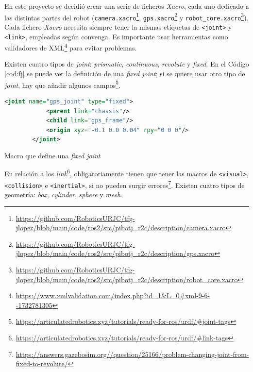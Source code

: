 En este proyecto se decidió crear una serie de ficheros \textit{Xacro}, cada uno dedicado a las distintas partes del robot (\verb|camera.xacro|\footnote{\url{https://github.com/RoboticsURJC/tfg-jlopez/blob/main/code/ros2/src/pibotj_r2c/description/camera.xacro}}, \verb|gps.xacro|\footnote{\url{https://github.com/RoboticsURJC/tfg-jlopez/blob/main/code/ros2/src/pibotj_r2c/description/gps.xacro}} y \verb|robot_core.xacro|\footnote{\url{https://github.com/RoboticsURJC/tfg-jlopez/blob/main/code/ros2/src/pibotj_r2c/description/robot_core.xacro}}). Cada fichero \textit{Xacro} necesita siempre tener la mismas etiquetas de \verb|<joint>| y \verb|<link>|, empleadas según convenga. Es importante usar herramientas como validadores de XML\footnote{\url{https://www.xmlvalidation.com/index.php?id=1&L=0\#xml-9-6--1732781305}} para evitar problemas.

Existen cuatro tipos de \textit{joint}: \textit{prismatic}, \textit{continuous}, \textit{revolute} y \textit{fixed}. En el Código \ref{cod:fj} se puede ver la definición de una \textit{fixed joint}; si se quiere usar otro tipo de \textit{joint}, hay que añadir algunos campos\footnote{\url{https://articulatedrobotics.xyz/tutorials/ready-for-ros/urdf/\#joint-tags}}.

\begin{code}[h]
	\begin{lstlisting}[language=xml]
		<joint name="gps_joint" type="fixed">
			<parent link="chassis"/>
			<child link="gps_frame"/>
			<origin xyz="-0.1 0.0 0.04" rpy="0 0 0"/>
		</joint>
	\end{lstlisting}
	\caption[Macro que define \textit{fixed joint}]{Macro que define una \textit{fixed joint}}
	\label{cod:fj}
			\end{code}

En relación a los \textit{link}\footnote{\url{https://articulatedrobotics.xyz/tutorials/ready-for-ros/urdf/\#link-tags}}, obligatoriamente tienen que tener las macros de \verb|<visual>|, \verb|<collision>| e \verb|<inertial>|, si no pueden surgir errores\footnote{\url{https://answers.gazebosim.org//question/25166/problem-changing-joint-from-fixed-to-revolute/}}. Existen cuatro tipos de geometría: \textit{box}, \textit{cylinder}, \textit{sphere} y \textit{mesh}. 

